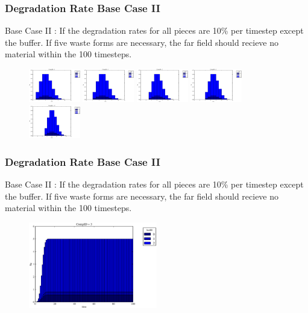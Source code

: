 \begin{frame}
  \frametitle{Degradation Rate Base Case II}
  Base Case II : If the degradation rates for all pieces are 10\% per timestep 
  except the buffer. If five waste forms are necessary, the far field should 
  recieve no material within the 100 timesteps.

  \begin{figure}[htbp!]
    \begin{center}
      \includegraphics[width=0.2\textwidth]{cyder/images/buff0deg2.eps}
      \includegraphics[width=0.2\textwidth]{cyder/images/buff0deg5.eps}
      \includegraphics[width=0.2\textwidth]{cyder/images/buff0deg7.eps}
      \includegraphics[width=0.2\textwidth]{cyder/images/buff0deg9.eps}
      \includegraphics[width=0.2\textwidth]{cyder/images/buff0deg11.eps}
    \end{center}
  \end{figure}
\end{frame}

\begin{frame}
  \frametitle{Degradation Rate Base Case II}
  Base Case II : If the degradation rates for all pieces are 10\% per timestep 
  except the buffer. If five waste forms are necessary, the far field should 
  recieve no material within the 100 timesteps.

  \begin{figure}[htbp!]
    \begin{center}
      \includegraphics[width=0.5\textwidth]{cyder/images/buff0deg3.eps}
    \end{center}
  \end{figure}
\end{frame}

